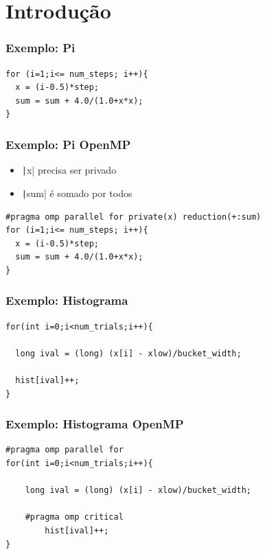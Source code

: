 \documentclass[xcolor={usenames,dvipsnames},12pt,presentation,aspectratio=169]{beamer}
\begin{document}
\section{Introdução}
\begin{frame}[fragile]
  \frametitle{Exemplo: Pi}
\begin{minipage}{0.95\textwidth}  
\begin{verbatim} 
for (i=1;i<= num_steps; i++){
  x = (i-0.5)*step;
  sum = sum + 4.0/(1.0+x*x);
}
\end{verbatim}
\end{minipage}
%
\end{frame}
\begin{frame}[fragile]
  \frametitle{Exemplo: Pi OpenMP}
\begin{itemize}
  \item \texttt|x| precisa ser privado
  \item \texttt|sum| é somado por todos
\end{itemize}
\begin{minipage}{0.95\textwidth}  
\begin{verbatim} 
#pragma omp parallel for private(x) reduction(+:sum)
for (i=1;i<= num_steps; i++){
  x = (i-0.5)*step;
  sum = sum + 4.0/(1.0+x*x);
}
\end{verbatim}
\end{minipage}
%
\end{frame}
\begin{frame}[fragile]
  \frametitle{Exemplo: Histograma}
\begin{minipage}{0.95\textwidth}  
\begin{verbatim} 
for(int i=0;i<num_trials;i++){
    
  long ival = (long) (x[i] - xlow)/bucket_width;

  hist[ival]++;  
}
\end{verbatim}
\end{minipage}
%
\end{frame}
\begin{frame}[fragile]
  \frametitle{Exemplo: Histograma OpenMP}
\begin{minipage}{0.95\textwidth}  
\begin{verbatim} 
#pragma omp parallel for
for(int i=0;i<num_trials;i++){
    
    long ival = (long) (x[i] - xlow)/bucket_width;

    #pragma omp critical
        hist[ival]++;   
}
\end{verbatim}
\end{minipage}
%
\end{frame}
\end{document}

